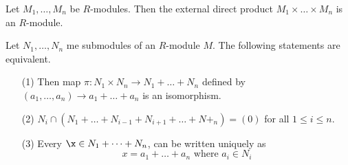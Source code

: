 \begin{lemma}\label{4.3.1}
    Let $M_1, \dots, M_n$ be $R$-modules. Then the external direct product  $M_1
    \times \dots \times M_n$ is an $R$-module.
\end{lemma}

\begin{lemma}\label{4.3.2}
    Let $N_1, \dots, N_n$ me submodules of an $R$-module  $M$. The following
    statements are equivalent.
    \begin{enumerate}
        \item[(1)] Then map $\pi:N_1 \times N_n \xrightarrow{} N_1+\dots+N_n$
            defined by $(a_1, \dots, a_n) \xrightarrow{} a_1+\dots+a_n$ is an
            isomorphism.

        \item[(2)] $N_i \cap (N_1+\dots+N_{i-1}+N_{i+1}+\dots+N+_n)=(0)$
            for all $1 \leq i \leq n$.

        \item[(3)] Every $\x \in N_1+\dots+N_n$, can be written uniquely as
            \begin{equation*}
                x=a_1+\dots+a_n \text{ where } a_i \in N_i
            \end{equation*}
    \end{enumerate}
\end{lemma}
